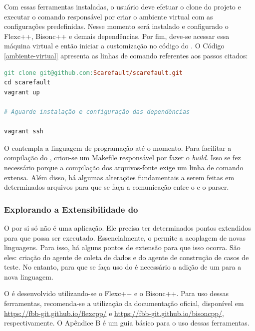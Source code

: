 Com essas ferramentas instaladas, o usuário deve efetuar o clone do projeto
e executar o comando responsável por criar o ambiente virtual com as configurações
predefinidas. Nesse momento será instalado e configurado o \textsf{Flexc++},
\textsf{Bisonc++} e demais dependências. Por fim, deve-se acessar essa máquina
virtual e então iniciar a customização no código do \Scarefault. O Código
\ref{ambiente-virtual} apresenta as linhas de comando referentes aos passos citados:

\begin{lstlisting}[language=make, label=ambiente-virtual, caption=Levantamento do Ambiente de Desenvolvimento]
git clone git@github.com:Scarefault/scarefault.git
cd scarefault
vagrant up

# Aguarde instalação e configuração das dependências

vagrant ssh
\end{lstlisting}

O \scarefault contempla a linguagem de programação \grails até o momento.
Para facilitar a compilação do \Scarefault, criou-se um \textsf{Makefile}
responsável por fazer o \textit{build}. Isso se fez necessário porque a
compilação dos arquivos-fonte exige um linha de comando extensa. Além disso,
há algumas alterações fundamentais a serem feitas em determinados arquivos
para que se faça a comunicação entre o \scanner e o \textsf{parser}.

\subsubsection{Explorando a Extensibilidade do \Scarefault}
O \scarefault por si só não é uma aplicação. Ele precisa ter determinados pontos
extendidos para que possa ser executado. Essencialmente, o \scarefault permite a
acoplagem de novas linguagens. Para isso, há alguns pontos de extensão para que
isso ocorra. São eles: criação do agente de coleta de dados e do agente de
construção de casos de teste. No entanto, para que se faça uso do \scarefault é
necessário a adição de um \parser para a nova linguagem.

O \parser é desenvolvido utilizando-se o \textsf{Flexc++} e o \textsf{Bisonc++}. Para
uso dessas ferramentas, recomenda-se a utilização da documentação oficial, disponível
em \url{https://fbb-git.github.io/flexcpp/} e \url{https://fbb-git.github.io/bisoncpp/},
respectivamente. O Apêndice B é um guia básico para o uso dessas ferramentas.

